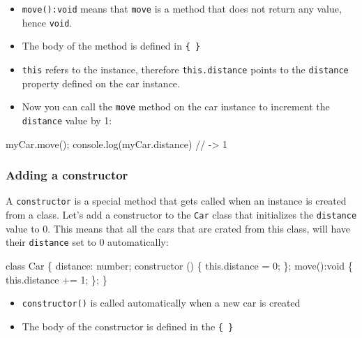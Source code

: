 \documentclass[12pt,]{article}
\newenvironment{Shaded}{}{}
\newcommand{\KeywordTok}[1]{\textcolor[rgb]{0.00,0.00,1.00}{{#1}}}
\newcommand{\DataTypeTok}[1]{{#1}}
\newcommand{\DecValTok}[1]{{#1}}
\newcommand{\CommentTok}[1]{\textcolor[rgb]{0.00,0.50,0.00}{{#1}}}
\newcommand{\FunctionTok}[1]{{#1}}
\newcommand{\NormalTok}[1]{{#1}}
\providecommand{\tightlist}{%
  \setlength{\itemsep}{0pt}\setlength{\parskip}{0pt}}
\begin{document}
\begin{itemize}
\tightlist
\item
  \texttt{move():void} means that \texttt{move} is a method that does
  not return any value, hence \texttt{void}.
\item
  The body of the method is defined in \texttt{\{\ \}}
\item
  \texttt{this} refers to the instance, therefore \texttt{this.distance}
  points to the \texttt{distance} property defined on the car instance.
\item
  Now you can call the \texttt{move} method on the car instance to
  increment the \texttt{distance} value by 1:
\end{itemize}

\begin{Shaded}
\begin{Highlighting}[numbers=left,,]
\NormalTok{myCar.}\FunctionTok{move}\NormalTok{();}
\NormalTok{console.}\FunctionTok{log}\NormalTok{(myCar.}\FunctionTok{distance}\NormalTok{) }\CommentTok{// -> 1}
\end{Highlighting}
\end{Shaded}

\subsubsection{Adding a constructor}\label{adding-a-constructor}

A \texttt{constructor} is a special method that gets called when an
instance is created from a class. Let's add a constructor to the
\texttt{Car} class that initializes the \texttt{distance} value to 0.
This means that all the cars that are crated from this class, will have
their \texttt{distance} set to 0 automatically:

\begin{Shaded}
\begin{Highlighting}[numbers=left,,]
\KeywordTok{class} \NormalTok{Car \{}
  \NormalTok{distance: number;}
  \FunctionTok{constructor} \NormalTok{() \{}
    \KeywordTok{this}\NormalTok{.}\FunctionTok{distance} \NormalTok{= }\DecValTok{0}\NormalTok{;}
  \NormalTok{\};}
  \FunctionTok{move}\NormalTok{():}\DataTypeTok{void} \NormalTok{\{}
    \KeywordTok{this}\NormalTok{.}\FunctionTok{distance} \NormalTok{+= }\DecValTok{1}\NormalTok{;}
  \NormalTok{\};}
\NormalTok{\}}
\end{Highlighting}
\end{Shaded}

\begin{itemize}
\tightlist
\item
  \texttt{constructor()} is called automatically when a new car is
  created
\item
  The body of the constructor is defined in the \texttt{\{\ \}}
\end{itemize}
\end{document}
